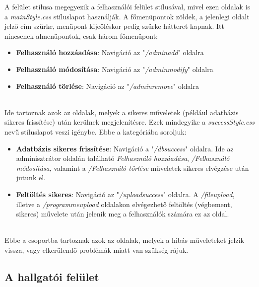 A felület stílusa megegyezik a felhasználói felület stílusával, mivel ezen oldalak is a \textit{mainStyle.css} stíluslapot használják. A főmenüpontok zöldek, a jelenlegi oldalt jelző cím szürke, menüpont kijeöléskor pedig szürke hátteret kapnak. Itt nincsenek almenüpontok, csak három főmenüpont:

\begin{itemize}
\item{\textbf{Felhasználó hozzáadása}: Navigáció az "\textit{/adminadd}" oldalra}
\item{\textbf{Felhasználó módosítása}: Navigáció az "\textit{/adminmodify}" oldalra}
\item{\textbf{Felhasználó törlése}: Navigáció az "\textit{/adminremove}" oldalra}
\end{itemize}

\\

Ide tartoznak azok az oldalak, melyek a sikeres műveletek (például adatbázis sikeres frissítése) után kerülnek megjelenítésre. Ezek mindegyike a \textit{successStyle.css} nevű stíluslapot veszi igénybe. Ebbe a kategóriába soroljuk:

\begin{itemize}
\item{\textbf{Adatbázis sikeres frissítése}: Navigáció a "\textit{/dbsuccess}" oldalra. Ide az adminisztrátor oldalán található \textit{Felhasználó hozzáadása}, \textit{/Felhasználó módosítása}, valamint a \textit{/Felhasználó törlése} műveletek sikeres elvégzése után jutunk el.}
\item{\textbf{Feltöltés sikeres}: Navigáció az "\textit{/uploadsuccess}" oldalra. A \textit{/fileupload}, illetve a \textit{/programmeupload} oldalakon elvégezhető feltöltés (végbement, sikeres) művelete után jelenik meg a felhasználók számára ez az oldal.}
\end{itemize}

\\

Ebbe a csoportba tartoznak azok az oldalak, melyek a hibás műveleteket jelzik vissza, vagy elkerülendő problémák miatt van szükség rájuk.


\subsection{A hallgatói felület}

